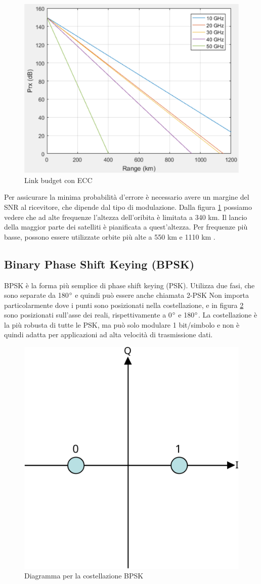 \begin{figure}[htbp]
  \centering
  \includegraphics[width=0.8\linewidth]{./res/img/link_budget_w_ecc.png}
  \caption{Link budget con \ac{ECC}}
  \label{fig:link-budget-w-ecc}
\end{figure}

Per assicurare la minima probabilità d'errore è necessario avere un margine del \ac{SNR} al ricevitore, che dipende dal tipo di modulazione.
Dalla figura \ref{fig:link-budget-w-ecc} possiamo vedere che ad alte frequenze l'altezza dell'oribita è limitata a 340 km.
Il lancio della maggior parte dei satelliti è pianificata a quest'altezza.
Per frequenze più basse, possono essere utilizzate orbite più alte a 550 km e 1110 km \cite{rozenvasser_estimation_2023}.

\subsection{Binary Phase Shift Keying (BPSK)}
\ac{BPSK} è la forma più semplice di phase shift keying (\ac{PSK}).
Utilizza due fasi, che sono separate da 180$\degree$ e quindi può essere anche chiamata 2-\ac{PSK}
Non importa particolarmente dove i punti sono posizionati nella costellazione, e in figura \ref{fig:bpsk-diagram} sono posizionati sull'asse dei reali, rispettivamente a 0$\degree$ e 180$\degree$.
La costellazione è la più robusta di tutte le \ac{PSK}, ma può solo modulare 1 bit/simbolo e non è quindi adatta per applicazioni ad alta velocità di trasmissione dati.

\begin{figure}[htbp]
  \centering
  \includegraphics[width=0.4\linewidth]{./res/img/bpsk_diagram.png}
  \caption{Diagramma per la costellazione BPSK}
  \label{fig:bpsk-diagram}
\end{figure}


